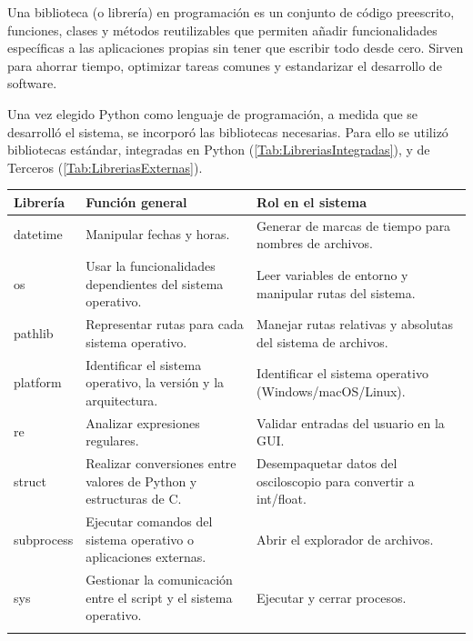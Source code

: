 Una biblioteca (o librería) en programación es un conjunto de código preescrito, funciones, clases y métodos reutilizables que permiten añadir funcionalidades específicas a las aplicaciones propias sin tener que escribir todo desde cero. Sirven para ahorrar tiempo, optimizar tareas comunes y estandarizar el desarrollo de software.\par
Una vez elegido Python como lenguaje de programación, a medida que se desarrolló el sistema, se incorporó las bibliotecas necesarias. Para ello se utilizó bibliotecas estándar, integradas en Python (\autoref{Tab:LibreriasIntegradas}), y de Terceros (\autoref{Tab:LibreriasExternas}).\par

\begin{table}[H]
    \begin{tabularx}{\textwidth}{lXX}
        \toprule
        \textbf{Librería} & \textbf{Función general} & \textbf{Rol en el sistema} \\ \midrule
        datetime   & Manipular fechas y horas.                                         & Generar de marcas de tiempo para nombres de archivos.                    \\ \addlinespace
        os         & Usar la funcionalidades dependientes del sistema operativo.       & Leer variables de entorno y manipular rutas del sistema.                 \\ \addlinespace
        pathlib    & Representar rutas para cada sistema operativo.                    & Manejar rutas relativas y absolutas del sistema de archivos.             \\ \addlinespace
        platform   & Identificar el sistema operativo, la versión y la arquitectura.   & Identificar el sistema operativo (Windows/macOS/Linux).                  \\ \addlinespace
        re         & Analizar expresiones regulares.                                   & Validar entradas del usuario en la GUI.                          \\ \addlinespace
        struct     & Realizar conversiones entre valores de Python y estructuras de C. & Desempaquetar datos del osciloscopio para convertir a int/float.         \\ \addlinespace
        subprocess & Ejecutar comandos del sistema operativo o aplicaciones externas.  & Abrir el explorador de archivos.                                         \\ \addlinespace
        sys        & Gestionar la comunicación entre el script y el sistema operativo. & Ejecutar y cerrar procesos.                                              \\ \addlinespace

\end{tabularx}
\end{table}
